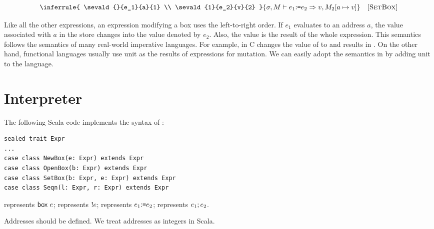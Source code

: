 
\vspace{-1em}

\[
  \inferrule
  {
    \sevald{}{e_1}{a}{1} \\
    \sevald{1}{e_2}{v}{2}
  }
  { \seval{\sigma}{M}{\eset{e_1}{e_2}}{v}{M_2[a\mapsto v]} }
  \quad\textsc{[SetBox]}
\]

Like all the other expressions, an expression modifying a box uses the left-to-right
order. If $e_1$ evaluates to an address $a$, the value associated with $a$ in
the store changes into the value denoted by $e_2$. Also, the value is the result
of the whole expression. This semantics follows the semantics of many real-world
imperative languages. For example,  in C changes the value of
 to  and results in . On the other hand, functional
languages usually use unit as the results of expressions for mutation. We can
easily adopt the semantics in \lang by adding unit to the language.

\section{Interpreter}

The following Scala code implements the syntax of \lang:

\begin{verbatim}
sealed trait Expr
...
case class NewBox(e: Expr) extends Expr
case class OpenBox(b: Expr) extends Expr
case class SetBox(b: Expr, e: Expr) extends Expr
case class Seqn(l: Expr, r: Expr) extends Expr
\end{verbatim}

 represents $\textsf{box}\ e$;
 represents $!e$;
 represents $e_1{:}\texttt{=} e_2$;
 represents $e_1;e_2$.

Addresses should be defined. We treat addresses as integers in Scala.

